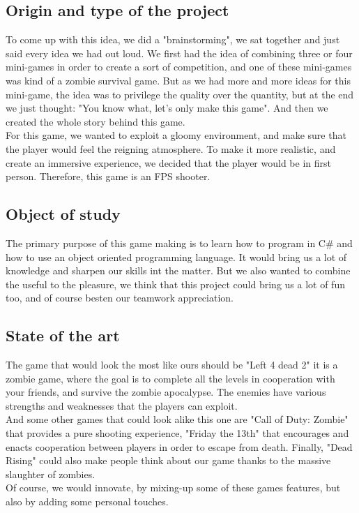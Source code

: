 \documentclass[12pt]{article}
\begin{document}
\subsection{Origin and type of the project}

		To come up with this idea, we did a "brainstorming", we sat together and just said every idea we had out loud. We first had the idea of combining three or four mini-games in order to create a sort of competition, and one of these mini-games was kind of a zombie survival game. But as we had more and more ideas for this mini-game, the idea was to privilege the quality over the quantity, but at the end we just thought: "You know what, let's only make this game". And then we created the whole story behind this game.\\
For this game, we wanted to exploit a gloomy environment, and make sure that the player would feel the reigning atmosphere. To make it more realistic, and create an immersive experience, we decided that the player would be in first person.
Therefore, this game is an FPS shooter.\\

\subsection{Object of study}

The primary purpose of this game making is to learn how to program in C\# and how to use an object oriented programming language.
It would bring us a lot of knowledge and sharpen our skills int the matter. But we also wanted to combine the useful to the pleasure, we think that this project could bring us a lot of fun too, and of course besten our teamwork appreciation.



\subsection{State of the art}

The game that would look the most like ours should be "Left 4 dead 2" it is a zombie game, where the goal is to complete all the levels in cooperation with your friends, and survive the zombie apocalypse. The enemies have various strengths and weaknesses that the players can exploit. \\
And some other games that could look alike this one are "Call of Duty: Zombie" that provides a pure shooting experience, "Friday the 13th" that encourages and enacts cooperation between players in order to escape from death. Finally, "Dead Rising" could also make people think about our game thanks to the massive slaughter of zombies.\\
Of course, we would innovate, by mixing-up some of these games features, but also by adding some personal touches.\newline
\end{document}

